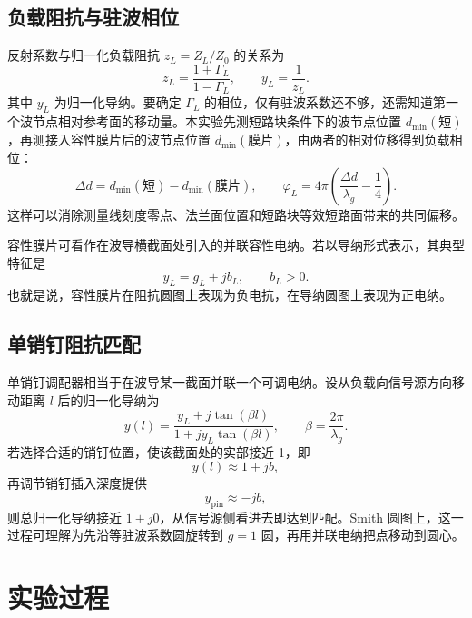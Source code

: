 \documentclass[UTF8]{ctexart}
\newcommand{\Zzero}{Z_0}
\begin{document}
\subsection{负载阻抗与驻波相位}

反射系数与归一化负载阻抗 $z_L=Z_L/\Zzero$ 的关系为
\begin{equation}
  z_L=\frac{1+\Gamma_L}{1-\Gamma_L},\qquad
  y_L=\frac{1}{z_L}.
  \label{eq:z-y}
\end{equation}
其中 $y_L$ 为归一化导纳。要确定 $\Gamma_L$ 的相位，仅有驻波系数还不够，还需知道第一个波节点相对参考面的移动量。本实验先测短路块条件下的波节点位置 $d_{\min}(\text{短})$，再测接入容性膜片后的波节点位置 $d_{\min}(\text{膜片})$，由两者的相对位移得到负载相位：
\begin{equation}
  \Delta d=d_{\min}(\text{短})-d_{\min}(\text{膜片}),
  \qquad
  \varphi_L=4\pi\left(\frac{\Delta d}{\lambda_g}-\frac{1}{4}\right).
  \label{eq:phase}
\end{equation}
这样可以消除测量线刻度零点、法兰面位置和短路块等效短路面带来的共同偏移。

容性膜片可看作在波导横截面处引入的并联容性电纳。若以导纳形式表示，其典型特征是
\begin{equation}
  y_L=g_L+jb_L,\qquad b_L>0.
  \label{eq:capacitive}
\end{equation}
也就是说，容性膜片在阻抗圆图上表现为负电抗，在导纳圆图上表现为正电纳。

\subsection{单销钉阻抗匹配}

单销钉调配器相当于在波导某一截面并联一个可调电纳。设从负载向信号源方向移动距离 $l$ 后的归一化导纳为
\begin{equation}
  y(l)=\frac{y_L+j\tan(\beta l)}
            {1+jy_L\tan(\beta l)},\qquad
  \beta=\frac{2\pi}{\lambda_g}.
  \label{eq:y-transform}
\end{equation}
若选择合适的销钉位置，使该截面处的实部接近 1，即
\begin{equation}
  y(l)\approx 1+jb,
\end{equation}
再调节销钉插入深度提供
\begin{equation}
  y_\mathrm{pin}\approx -jb,
  \label{eq:pin}
\end{equation}
则总归一化导纳接近 $1+j0$，从信号源侧看进去即达到匹配。Smith 圆图上，这一过程可理解为先沿等驻波系数圆旋转到 $g=1$ 圆，再用并联电纳把点移动到圆心。

\section{实验过程}
\end{document}

